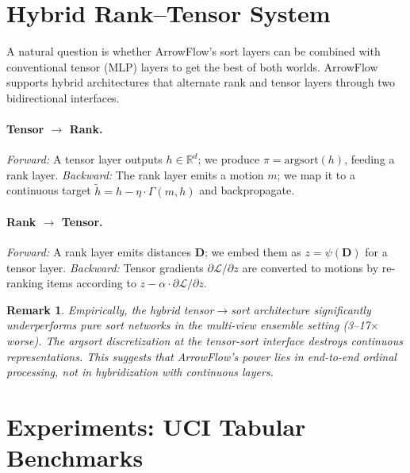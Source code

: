 \documentclass[12pt]{article}
\newcommand{\R}{\mathbb{R}}
\newcommand{\argsort}{\mathrm{argsort}}
\newtheorem{remark}{Remark}
\begin{document}
\section{Hybrid Rank--Tensor System}
\label{sec:hybrid}

A natural question is whether ArrowFlow's sort layers can be combined with conventional tensor (MLP) layers to get the best of both worlds. ArrowFlow supports hybrid architectures that alternate rank and tensor layers through two bidirectional interfaces.

\paragraph{Tensor $\to$ Rank.}
\emph{Forward:} A tensor layer outputs $h \in \R^d$; we produce $\pi = \argsort(h)$, feeding a rank layer.
\emph{Backward:} The rank layer emits a motion $m$; we map it to a continuous target $\tilde{h} = h - \eta \cdot \Gamma(m, h)$ and backpropagate.

\paragraph{Rank $\to$ Tensor.}
\emph{Forward:} A rank layer emits distances $\bm{D}$; we embed them as $z = \psi(\bm{D})$ for a tensor layer.
\emph{Backward:} Tensor gradients $\partial \mathcal{L} / \partial z$ are converted to motions by re-ranking items according to $z - \alpha \cdot \partial\mathcal{L}/\partial z$.

\begin{remark}
Empirically, the hybrid tensor$\to$sort architecture significantly underperforms pure sort networks in the multi-view ensemble setting (3--17$\times$ worse). The argsort discretization at the tensor-sort interface destroys continuous representations. This suggests that ArrowFlow's power lies in \emph{end-to-end ordinal processing}, not in hybridization with continuous layers.
\end{remark}


\section{Experiments: UCI Tabular Benchmarks}
\label{sec:experiments}
\end{document}
